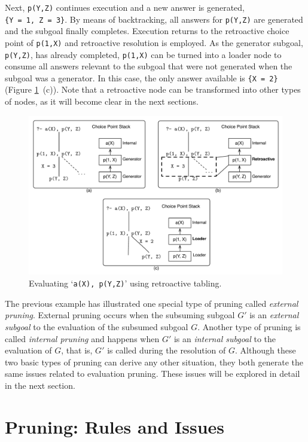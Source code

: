Next, \texttt{p(Y,Z)} continues execution and a new answer is generated, \texttt{\{Y~=~1,~Z~=~3\}}.
By means of backtracking, all answers for \texttt{p(Y,Z)} are generated and the subgoal finally completes.
Execution returns to the retroactive choice point of \texttt{p(1,X)} and retroactive resolution is employed.
As the generator subgoal, \texttt{p(Y,Z)}, has already completed, \texttt{p(1,X)} can be turned into a loader
node to consume all answers relevant to the subgoal that were not generated when the subgoal was a generator.
In this case, the only answer available is \texttt{\{X~=~2\}} (Figure \ref{fig:retro_eval1}~(c)).
Note that a retroactive node can be transformed into other types of nodes, as it will become clear in the next
sections.

\begin{figure}[ht]
  \centering
    \includegraphics[scale=0.6]{pruning_example1.pdf}
  \caption{Evaluating `\texttt{a(X),~p(Y,Z)}' using retroactive tabling.}
  \label{fig:retro_eval1}
\end{figure}

The previous example has illustrated one special type of pruning called \textit{external pruning}.
External pruning occurs when the subsuming subgoal $G'$ is an \textit{external subgoal} to the evaluation
of the subsumed subgoal $G$. Another type of pruning is called \textit{internal pruning} and happens
when $G'$ is an \textit{internal subgoal} to the evaluation of $G$, that is, $G'$ is called
during the resolution of $G$. Although these two basic types of pruning can derive any other
situation, they both generate the same issues related to evaluation pruning. These issues will be explored
in detail in the next section.

\section{Pruning: Rules and Issues}

